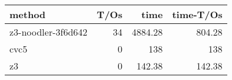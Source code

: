\begin{tabular}{lrrr}
\hline
 method             &   T/Os &    time &   time-T/Os \\
\hline
 z3-noodler-3f6d642 &     34 & 4884.28 &      804.28 \\
 cvc5               &      0 &  138    &      138    \\
 z3                 &      0 &  142.38 &      142.38 \\
\hline
\end{tabular}
